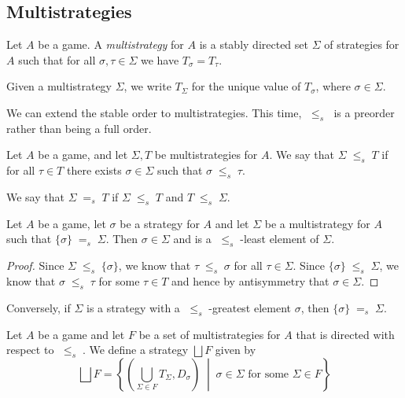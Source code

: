 \documentclass{entcs} \usepackage{prentcsmacro}
\newcommand{\stle}{{\;\le_s\;}}
\newcommand{\steq}{{\;=_s\;}}
\newcommand{\exlub}{\bigsqcup}
\newcommand{\0}{{\mathtt{0}}}
\newcommand{\Tau}{T}
\begin{document}
\subsection{Multistrategies}

\begin{definition}
  Let $A$ be a game.  A \emph{multistrategy} for $A$ is a stably directed set $\Sigma$ of strategies for $A$ such that for all $\sigma,\tau\in \Sigma$ we have $T_\sigma=T_\tau$.

  Given a multistrategy $\Sigma$, we write $T_\Sigma$ for the unique value of $T_\sigma$, where $\sigma\in\Sigma$.

  We can extend the stable order to multistrategies.  This time, $\stle$ is a preorder rather than being a full order.

  Let $A$ be a game, and let $\Sigma,\Tau$ be multistrategies for $A$.  We say that $\Sigma\stle\Tau$ if for all $\tau\in\Tau$ there exists $\sigma\in\Sigma$ such that $\sigma\stle\tau$.

  We say that $\Sigma \steq \Tau$ if $\Sigma\stle\Tau$ and $\Tau\stle\Sigma$.
\end{definition}

\begin{lemma}
  Let $A$ be a game, let $\sigma$ be a strategy for $A$ and let $\Sigma$ be a multistrategy for $A$ such that $\{\sigma\}\steq\Sigma$.  Then $\sigma\in\Sigma$ and is a $\stle$-least element of $\Sigma$.
\end{lemma}
  \begin{proof}
    Since $\Sigma\stle\{\sigma\}$, we know that $\tau\stle\sigma$ for all $\tau\in\Sigma$.  Since $\{\sigma\}\stle\Sigma$, we know that $\sigma\stle\tau$ for some $\tau\in\Tau$ and hence by antisymmetry that $\sigma\in\Sigma$.
  \end{proof}

Conversely, if $\Sigma$ is a strategy with a $\stle$-greatest element $\sigma$, then $\{\sigma\}\steq\Sigma$.

\begin{definition}
  Let $A$ be a game and let $F$ be a set of multistrategies for $A$ that is directed with respect to $\stle$.  We define a strategy $\exlub F$ given by
  \[
    \exlub F = \left\{\left(\bigcup_{\Sigma\in F} T_\Sigma, D_\sigma\right)\;\middle|\;\textrm{$\sigma\in\Sigma$ for some $\Sigma\in F$}\right\}
    \]
\end{definition}
\end{document}
